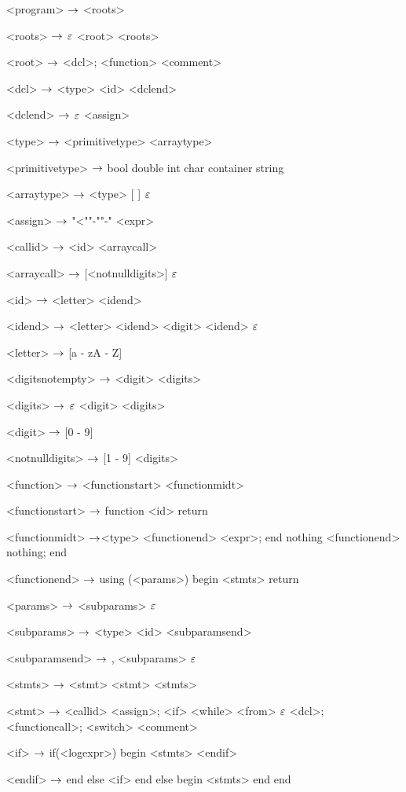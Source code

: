 \begin{grammar}
<program> $\rightarrow$ <roots>

<roots> $\rightarrow$ $\varepsilon$
\alt <root> <roots>

<root> $\rightarrow$ <dcl>;
\alt <function>
\alt <comment>

<dcl> $\rightarrow$ <type> <id> <dclend>

<dclend> $\rightarrow$ $\varepsilon$
\alt <assign> 

<type> $\rightarrow$ <primitivetype> <arraytype>

<primitivetype> $\rightarrow$ bool
\alt double
\alt int
\alt char
\alt container
\alt string

<arraytype> $\rightarrow$ <type> [ ]
\alt $\varepsilon$


<assign>  $\rightarrow$ "<""-""-" <expr>

<callid> $\rightarrow$ <id> <arraycall>

<arraycall> $\rightarrow$ [<notnulldigits>]
\alt $\varepsilon$

<id> $\rightarrow$ <letter> <idend>

<idend> $\rightarrow$ <letter> <idend>
	\alt <digit> <idend>
	\alt $\varepsilon$

<letter> $\rightarrow$ [a - zA - Z]

<digitsnotempty> $\rightarrow$ <digit> <digits>

<digits> $\rightarrow$ $\varepsilon$
\alt <digit> <digits>

<digit> $\rightarrow$ [0 - 9]

<notnulldigits> $\rightarrow$ [1 - 9] <digits>

<function> $\rightarrow$  <functionstart> <functionmidt>

<functionstart> $\rightarrow$ function <id> return

<functionmidt> $\rightarrow$<type> <functionend> <expr>; end
\alt nothing <functionend> nothing; end

<functionend> $\rightarrow$
using (<params>)
begin
	<stmts>
	return

<params> $\rightarrow$ <subparams>
	\alt $\varepsilon$

<subparams> $\rightarrow$ <type> <id> <subparamsend>

<subparamsend> $\rightarrow$ , <subparams>
\alt $\varepsilon$

<stmts> $\rightarrow$ <stmt>
	\alt <stmt> <stmts>

<stmt> $\rightarrow$ <callid> <assign>;
	\alt <if>
	\alt <while>
	\alt <from>
	\alt $\varepsilon$
	\alt <dcl>;
	\alt <functioncall>;
	\alt <switch>
	\alt <comment>
	
<if> $\rightarrow$ if(<logexpr>)
	begin
		<stmts>
	<endif>

<endif> $\rightarrow$ end
	else <if>
	\alt end
	else
	begin
		<stmts>
	end
	\alt end
	 

\end{grammar}
